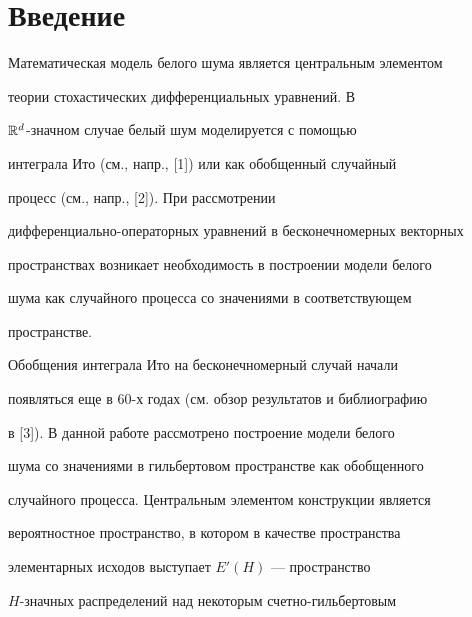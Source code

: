 

\maketitle


\label{begin}











\section*{Введение}





Математическая модель белого шума является центральным элементом


теории стохастических дифференциальных уравнений. В


$\Bbb{R}^d$-значном случае белый шум моделируется с помощью


интеграла Ито (см., напр., [1])  или как обобщенный случайный


процесс (см., напр., [2]). При рассмотрении


дифференциально-операторных уравнений в бесконечномерных векторных


пространствах возникает необходимость в построении модели белого


шума как случайного процесса со значениями в соответствующем


пространстве.





Обобщения интеграла Ито на бесконечномерный случай начали


появляться еще в 60-х годах (см. обзор результатов и библиографию


в [3]). В данной работе рассмотрено построение модели белого


шума со значениями в гильбертовом пространстве как обобщенного


случайного процесса. Центральным элементом конструкции является


вероятностное пространство, в котором в качестве пространства


элементарных исходов выступает $E'(H)$ --- пространство


$H$-значных распределений над некоторым счетно-гильбертовым


